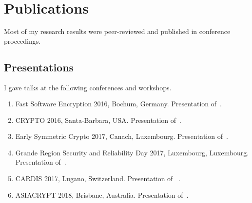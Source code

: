 \section{Publications}
{


Most of my research results were peer-reviewed and published in conference proceedings.

{
\renewcommand{\clearpage}{} 
\renewcommand{\chapter}{\subsection} 
}
{
\renewcommand{\clearpage}{} 
\renewcommand{\chapter}{\subsection} 
}
{
\renewcommand{\clearpage}{} 
\renewcommand{\chapter}{\subsection} 
}


\subsection*{Presentations}

I gave talks at the following conferences and workshops.
\begin{enumerate}
    \item Fast Software Encryption 2016, Bochum, Germany. Presentation of~.
    \item CRYPTO 2016, Santa-Barbara, USA. Presentation of~.
    \item Early Symmetric Crypto 2017, Canach, Luxembourg. Presentation of~.
    \item Grande Region Security and Reliability Day 2017, Luxembourg, Luxembourg. Presentation of~. 
    \item CARDIS 2017, Lugano, Switzerland. Presentation of ~.
    \item ASIACRYPT 2018, Brisbane, Australia. Presentation of~.
\end{enumerate}

}
